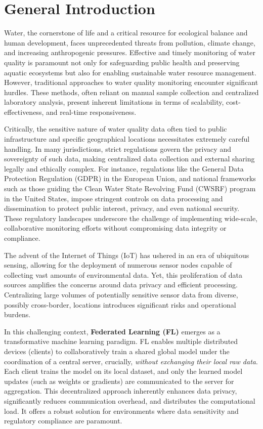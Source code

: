\chapter*{General Introduction}
\label{chap: General Introduction}
Water, the cornerstone of life and a critical resource for ecological balance and human development, faces unprecedented threats from pollution, climate change, and increasing anthropogenic pressures. Effective and timely monitoring of water quality is paramount not only for safeguarding public health and preserving aquatic ecosystems but also for enabling sustainable water resource management. However, traditional approaches to water quality monitoring encounter significant hurdles. These methods, often reliant on manual sample collection and centralized laboratory analysis, present inherent limitations in terms of scalability, cost-effectiveness, and real-time responsiveness.

Critically, the sensitive nature of water quality data often tied to public infrastructure and specific geographical locations necessitates extremely careful handling. In many jurisdictions, strict regulations govern the privacy and sovereignty of such data, making centralized data collection and external sharing legally and ethically complex. For instance, regulations like the General Data Protection Regulation (GDPR) in the European Union, and national frameworks such as those guiding the Clean Water State Revolving Fund (CWSRF) program in the United States, impose stringent controls on data processing and dissemination to protect public interest, privacy, and even national security. These regulatory landscapes underscore the challenge of implementing wide-scale, collaborative monitoring efforts without compromising data integrity or compliance.

The advent of the Internet of Things (IoT) has ushered in an era of ubiquitous sensing, allowing for the deployment of numerous sensor nodes capable of collecting vast amounts of environmental data. Yet, this proliferation of data sources amplifies the concerns around data privacy and efficient processing. Centralizing large volumes of potentially sensitive sensor data from diverse, possibly cross-border, locations introduces significant risks and operational burdens.

In this challenging context, \textbf{Federated Learning (FL)} emerges as a transformative machine learning paradigm. FL enables multiple distributed devices (clients) to collaboratively train a shared global model under the coordination of a central server, crucially, \textit{without exchanging their local raw data}. Each client trains the model on its local dataset, and only the learned model updates (such as weights or gradients) are communicated to the server for aggregation. This decentralized approach inherently enhances data privacy, significantly reduces communication overhead, and distributes the computational load. It offers a robust solution for environments where data sensitivity and regulatory compliance are paramount.

